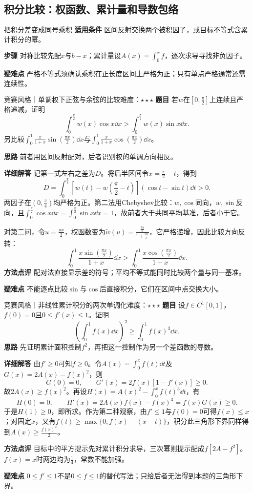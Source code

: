 \subsection{积分比较：权函数、累计量和导数包络}\label{ci:inequality}
\begin{method}{把积分差变成同号乘积}
\textbf{适用条件} 区间反射交换两个被积因子，或目标不等式含累计积分的幂。\par
\textbf{步骤} 对称比较先配$x$与$b-x$；累计量设$A(x)=\int_0^xf$，逐次求导寻找非负因子。\par
\textbf{疑难点} 严格不等式须确认乘积在正长度区间上严格为正；只有单点严格通常还需连续性。
\end{method}
\begin{example}{竞赛风格｜单调权下正弦与余弦的比较}{难度：$\star\star\star$}\label{ci:ex:trigweight}
\textbf{题目} 若$w$在$[0,\frac{\pi}{2}]$上连续且严格递减，证明
\[
 \int_0^{\frac{\pi}{2}}w(x)\cos x\dd x>
 \int_0^{\frac{\pi}{2}}w(x)\sin x\dd x.
\]
另比较$\int_0^1\frac{x}{1+x}\sin(\frac{\pi x}{2})\dd x$与$\int_0^1\frac{x}{1+x}\cos(\frac{\pi x}{2})\dd x$。\par
\textbf{思路} 前者用区间反射配对，后者识别权的单调方向相反。\par
\textbf{详细解答} 记第一式左右之差为$D$。将后半区间令$x=\frac{\pi}{2}-t$，得到
\[
 D=\int_0^{\frac{\pi}{4}}
 \left[w(t)-w\!\left(\dfrac\pi2-t\right)\right](\cos t-\sin t)\dd t>0.
\]
两因子在$(0,\frac{\pi}{4})$均严格为正。第二法用Chebyshev比较：$w,\cos$同向，$w,\sin$反向，且$\int_0^{\frac{\pi}{2}}\cos x\dd x=\int_0^{\frac{\pi}{2}}\sin x\dd x=1$，故前者大于共同平均基准，后者小于它。\par
对第二问，令$u=\frac{\pi x}{2}$，权函数变为$\widetilde w(u)=\frac{\frac{2u}{\pi}}{1+\frac{2u}{\pi}}$，它严格递增，因此比较方向反转：
\[
 \int_0^1\dfrac{x\sin(\frac{\pi x}{2})}{1+x}\dd x>
 \int_0^1\dfrac{x\cos(\frac{\pi x}{2})}{1+x}\dd x.
\]
\textbf{方法点评} 配对法直接显示差的符号；平均不等式能同时比较两个量与同一基准。\par
\textbf{疑难点} 不能逐点比较$\sin$与$\cos$后直接积分，它们在区间中点交换大小。
\end{example}
\begin{example}{竞赛风格｜非线性累计积分的两次单调化}{难度：$\star\star\star$}\label{ci:ex:cumulative}
\textbf{题目} 设$f\in C^1[0,1]$，$f(0)=0$且$0\le f'(x)\le1$。证明
\[
 \left(\int_0^1f(x)\dd x\right)^2\ge\int_0^1f(x)^3\dd x.
\]
\textbf{思路} 先证明累计面积控制$f^2$，再把这一控制作为另一个差函数的导数。\par
\textbf{详细解答} 由$f'\ge0$可知$f\ge0$。令$A(x)=\int_0^xf(t)\dd t$及$G(x)=2A(x)-f(x)^2$，则
\[
 G(0)=0,\qquad G'(x)=2f(x)[1-f'(x)]\ge0.
\]
故$2A(x)\ge f(x)^2$。再设$H(x)=A(x)^2-\int_0^xf(t)^3\dd t$，有
\[
 H(0)=0,\qquad H'(x)=2A(x)f(x)-f(x)^3=f(x)G(x)\ge0.
\]
于是$H(1)\ge0$，即所求。作为第二种观察，由$f'\le1$与$f(0)=0$可得$f(x)\le x$；对固定$x$，又有$f(t)\ge\max\{0,f(x)-(x-t)\}$，积分此三角形下界同样得到$A(x)\ge \frac{f(x)^2}{2}$。\par
\textbf{方法点评} 目标中的平方提示先对累计积分求导，三次幂则提示配成$f[2A-f^2]$。$f(x)=x$时两边均为$\frac{1}{4}$，常数不能加强。\par
\textbf{疑难点} $0\le f'\le1$不是$0\le f\le1$的替代写法；只给后者无法得到本题的三角形下界。
\end{example}
